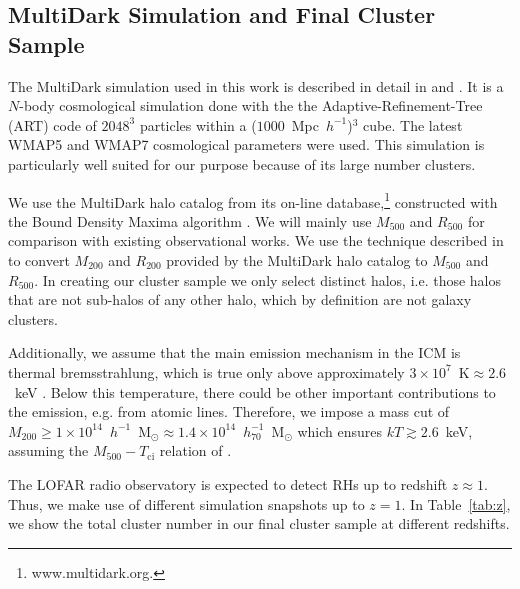\documentclass[traditabstract]{aa}
\newcommand{\rmn}{\mathrm}
\begin{document}
\subsection{MultiDark Simulation and Final Cluster Sample}
\label{sec:2.1}
The MultiDark simulation used in this work is
described in detail in \cite{2011arXiv1104.5130P} and
\cite{2011arXiv1109.0003R}.  It is a $N$-body cosmological simulation done with
the the Adaptive-Refinement-Tree (ART) code \citep{1997ApJS..111...73K} of
$2048^3$ particles within a ($1000$~Mpc~$h^{-1}$)$^3$ cube. The latest WMAP5 and
WMAP7 cosmological parameters were used. This simulation is particularly well
suited for our purpose because of its large number clusters.
 
We use the MultiDark halo catalog from its on-line database,\footnote{www.multidark.org.} 
constructed with the Bound Density Maxima algorithm \citep{1997astro.ph.12217K}.  
We will mainly use $M_{500}$ and $R_{500}$ for comparison with existing observational works.  
We use the technique described in \cite{2003ApJ...584..702H} to convert $M_{200}$ and
$R_{200}$ provided by the MultiDark halo catalog to $M_{500}$ and $R_{500}$.  In
creating our cluster sample we only select distinct halos, i.e. those halos that
are not sub-halos of any other halo, which by definition are not galaxy clusters.

Additionally, we assume that the main emission mechanism in the ICM is thermal
bremsstrahlung, which is true only above approximately
$3\times10^{7}$~$\rmn{K}\approx2.6$~keV \citep{1988xrec.book.....S}. Below this
temperature, there could be other important contributions to the emission,
e.g. from atomic lines. Therefore, we impose a mass cut of
$M_{200}\geq1\times10^{14}$~$h^{-1}$~M$_{\odot}\approx1.4\times10^{14}$~$h_{70}^{-1}$~M$_{\odot}$
which ensures $kT \gtrsim 2.6$~keV, assuming the $M_{500} - T_{\rmn{ci}}$ relation
of \cite{2010MNRAS.406.1773M}.

The LOFAR radio observatory is expected to detect RHs up to redshift $z \approx
1$. Thus, we make use of different simulation snapshots up to $z=1$. In
Table~\ref{tab:z}, we show the total cluster number in our final cluster sample
at different redshifts.
\end{document}
